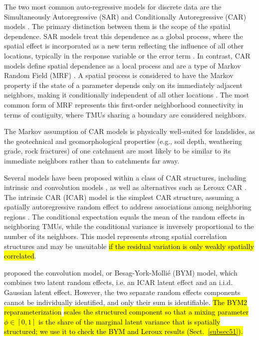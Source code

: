 \documentclass[journal abbreviation, manuscript]{copernicus}
\newcommand{\hlE}[1]{{\sethlcolor{edcyan}\hl{#1}}}
\begin{document}
The two most common auto-regressive models for discrete data are the Simultaneously Autoregressive (SAR) and Conditionally Autoregressive (CAR) models \citep{jaya2021spatial}. The primary distinction between them is the scope of the spatial dependence. SAR models treat this dependence as a global process, where the spatial effect is incorporated as a new term reflecting the influence of all other locations, typically in the response variable or the error term \citep{hooten2014simultaneous, anselin1988spatial}. In contrast, CAR models define spatial dependence as a local process and are a type of Markov Random Field (MRF) \citep{earnest2007evaluating, besag1991bayesian}. A spatial process is considered to have the Markov property if the state of a parameter depends only on its immediately adjacent neighbors, making it conditionally independent of all other locations \citep{clifford1990markov, rue2005gaussian}. The most common form of MRF represents this first-order neighborhood connectivity in terms of contiguity, where TMUs sharing a boundary are considered neighbors.

The Markov assumption of CAR models is physically well-suited for landslides, as the geotechnical and geomorphological properties (e.g., soil depth, weathering grade, rock fractures) of one catchment are most likely to be similar to its immediate neighbors rather than to catchments far away.

Several models have been proposed within a class of CAR structures, including intrinsic and convolution models \citep{besag1991bayesian}, as well as alternatives such as Leroux CAR \citep{leroux2000estimation}. The intrinsic CAR (ICAR) model is the simplest CAR structure, assuming a spatially autoregressive random effect to address associations among neighboring regions \citep{besag1991bayesian}. The conditional expectation equals the mean of the random effects in neighboring TMUs, while the conditional variance is inversely proportional to the number of its neighbors. This model represents strong spatial correlation structures and may be unsuitable \hlE{if the residual variation is only weakly spatially correlated}.

\citet{besag1991bayesian} proposed the convolution model, or Besag-York-Molli\'{e} (BYM) model, which combines two latent random effects, i.e. an ICAR latent effect and an i.i.d. Gaussian latent effect. However, the two separate random effects components cannot be individually identified, and only their sum is identifiable. \hlE{The BYM2 reparameterization }\citep{riebler2016intuitive}\hlE{ scales the structured component so that a mixing parameter $\phi \in [0,1]$ is the share of the marginal latent variance that is spatially structured; we use it to check the BYM and Leroux results (\mbox{Sect.~\ref{subsec51}}).}
\end{document}
